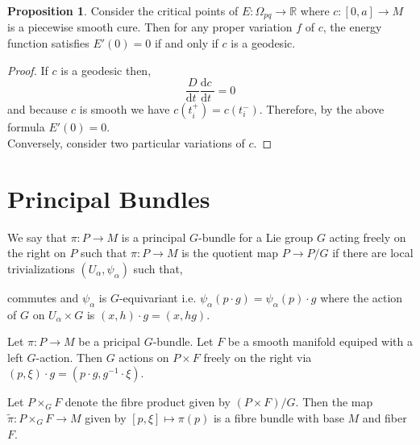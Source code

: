 \documentclass[12pt]{extarticle}
\newcommand{\R}{\mathbb{R}}
\renewcommand{\d}[1]{ \mathrm{d}#1 \:}
\newcommand{\deriv}[2]{\frac{\d{#1}}{\d{#2}}}
\theoremstyle{definition}
\newtheorem{proposition}[theorem]{Proposition}
\newenvironment{definition}[1][Definition:]{\begin{trivlist}
\item[\hskip \labelsep {\bfseries #1}]}{\end{trivlist}}
\begin{document}
\begin{proposition}
Consider the critical points of $E : \Omega_{pq} \to \R$ where $c : [0, a] \to M$ is a piecewise smooth cure. Then for any proper variation $f$ of $c$, the energy function satisfies $E'(0) = 0$ if and only if $c$ is a geodesic. 
\end{proposition}

\begin{proof}
If $c$ is a geodesic then,
\[ \frac{D}{\d{t}} \deriv{c}{t} = 0 \]
and because $c$ is smooth we have $c(t_i^+) = c(t_i^-)$. Therefore, by the above formula $E'(0) = 0$.
\bigskip\\
Conversely, consider two particular variations of $c$. 
\end{proof}

\section{Principal Bundles}

\begin{definition}
We say that $\pi : P \to M$ is a principal $G$-bundle for a Lie group $G$ acting freely on the right on $P$ such that $\pi : P \to M$ is the quotient map $P \to P / G$ if there are local trivializations $(U_\alpha, \psi_\alpha)$ such that,
\begin{center}
\end{center}
commutes and $\psi_\alpha$ is $G$-equivariant i.e. $\psi_\alpha(p \cdot g) = \psi_\alpha(p) \cdot g$ where the action of $G$ on $U_\alpha \times G$ is $(x, h) \cdot g = (x, hg)$. 
\end{definition}

\begin{definition}
Let $\pi : P \to M$ be a pricipal $G$-bundle. Let $F$ be a smooth manifold equiped with a left $G$-action. Then $G$ actions on $P \times F$ freely on the right via $(p, \xi) \cdot g = (p \cdot g, g^{-1} \cdot \xi)$. 
\end{definition}

\begin{definition}
Let $P \times_G F$ denote the fibre product given by $(P \times F)/G$. Then the map $\tilde{\pi} : P \times_G F \to M$ given by $[p, \xi] \mapsto \pi(p)$ is a fibre bundle with base $M$ and fiber $F$. 
\end{definition}
\end{document}
